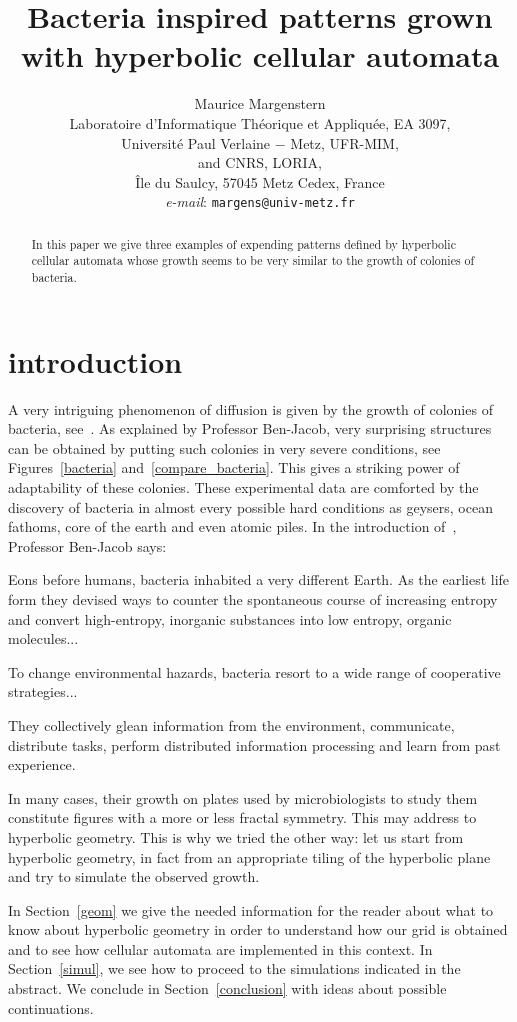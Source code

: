 \documentclass{article}
\title{
Bacteria inspired patterns grown with
hyperbolic cellular automata}
\author{Maurice Margenstern\\
Laboratoire d'Informatique Th\'eorique et Appliqu\'ee, EA 3097,\\
        Universit\'e Paul Verlaine $-$ Metz, UFR-MIM, \\
        and CNRS, LORIA,\\
        \^Ile du Saulcy, 57045 Metz Cedex, France\\
{\it e-mail}: {\tt margens@univ-metz.fr}
}
\begin{document}
\maketitle

\begin{abstract}
In this paper we give three examples of expending patterns defined by
hyperbolic cellular automata whose growth seems to be very similar to the 
growth of colonies of bacteria.
\end{abstract}

\section{introduction}
\label{intro}
   A very intriguing phenomenon of diffusion is given by the growth of colonies
of bacteria, see~\cite{benjacob}. As 
explained by Professor Ben-Jacob, very surprising
structures can be obtained by putting such colonies in very severe conditions, 
see Figures~\ref{bacteria} and~\ref{compare_bacteria}. 
This gives a striking power of adaptability of these colonies. These 
experimental data are comforted by the discovery of bacteria in almost 
every possible hard 
conditions as geysers, ocean fathoms, core of the earth and even atomic piles.
In the introduction of~\cite{benjacob}, Professor Ben-Jacob says:
\vskip 7pt
{\leftskip 20pt\rightskip 20pt\small
Eons before humans, bacteria inhabited a very different Earth.
As the earliest life form they devised ways to counter the spontaneous
course of increasing entropy and convert high-entropy, inorganic substances
into low entropy, organic molecules...

To change environmental hazards, bacteria resort to a wide range of
cooperative strategies...

They collectively glean information from the environment, communicate,
distribute tasks, perform distributed information processing and learn
from past experience.
\par}
\vskip 7pt

   In many cases, their growth on plates used by microbiologists to study them
constitute figures with a more or less fractal symmetry. This may address to
hyperbolic geometry. This is why we tried the other way: let us start from
hyperbolic geometry, in fact from an appropriate tiling of the hyperbolic plane
and try to simulate the observed growth.

   In Section~\ref{geom} we give the needed information for the reader about 
what to know about hyperbolic geometry in order to understand how our grid is 
obtained and to see how cellular automata are implemented in this context.
In Section~\ref{simul}, we see how to proceed to the simulations indicated
in the abstract. We conclude in Section~\ref{conclusion} with ideas about
possible continuations.
\end{document}
